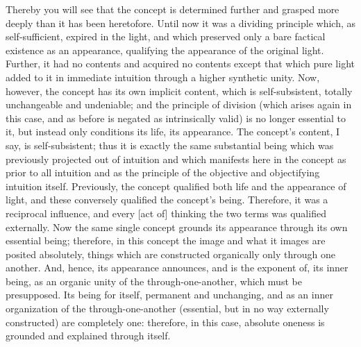 Thereby you will see that the concept is
determined further and grasped more deeply
than it has been heretofore.
Until now it was a dividing principle
which, as self-sufficient, expired in the light,
and which preserved only a bare
factical existence as an appearance,
qualifying the appearance of the original light.
Further, it had no contents and acquired no contents
except that which pure light added to it
in immediate intuition through a higher synthetic unity.
Now, however, the concept has its own implicit content,
which is self-subsistent, totally unchangeable and undeniable;
and the principle of division
(which arises again in this case,
and as before is negated as intrinsically valid)
is no longer essential to it,
but instead only conditions its life,
its appearance.
The concept's content, I say, is self-subsistent;
thus it is exactly the same substantial being
which was previously projected out of intuition
and which manifests here in the concept
as prior to all intuition
and as the principle of
the objective and objectifying intuition itself.
Previously, the concept qualified
both life and the appearance of light,
and these conversely qualified the concept's being.
Therefore, it was a reciprocal influence,
and every [act of] thinking the two terms
was qualified externally.
Now the same single concept
grounds its appearance
through its own essential being;
therefore, in this concept
the image and what it images
are posited absolutely,
things which are constructed
organically only through one another.
And, hence, its appearance announces,
and is the exponent of, its inner being,
as an organic unity of the through-one-another,
which must be presupposed.
Its being for itself,
permanent and unchanging,
and as an inner organization of
the through-one-another
(essential, but in no way externally constructed)
are completely one:
therefore, in this case,
absolute oneness is grounded
and explained through itself.

